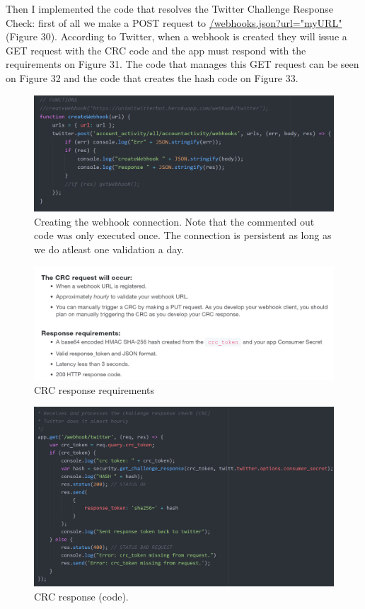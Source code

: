 \documentclass[12pt]{article} %
\begin{document}
\begin{enumerate}
		Then I implemented the code that resolves the Twitter Challenge Response Check: first of all we make a POST request to \url{/webhooks.json?url="myURL"} (Figure 30).
		According to Twitter, when a webhook is created they will issue a GET request with the CRC code and the app must respond with the requirements on Figure 31.
		The code that manages this GET request can be seen on Figure 32 and the code that creates the hash code on Figure 33.
		
		\begin{figure}[H] %
		\includegraphics[width=1\linewidth]{images/createWebhook}
		\caption{Creating the webhook connection. Note that the commented out code was only executed once. The connection is persistent as long as we do atleast one
		validation a day.}
		\label{createWebhook}
		\end{figure}

		\begin{figure}[H] %
		\includegraphics[width=1\linewidth]{images/CRCrequirements}
		\caption{CRC response requirements}
		\label{CRCrequirements}
		\end{figure}

		\begin{figure}[H] %
		\includegraphics[width=1\linewidth]{images/CRCresponse}
		\caption{CRC response (code).}
		\label{CRCresponse}
		\end{figure}


\end{enumerate}
\end{document}
